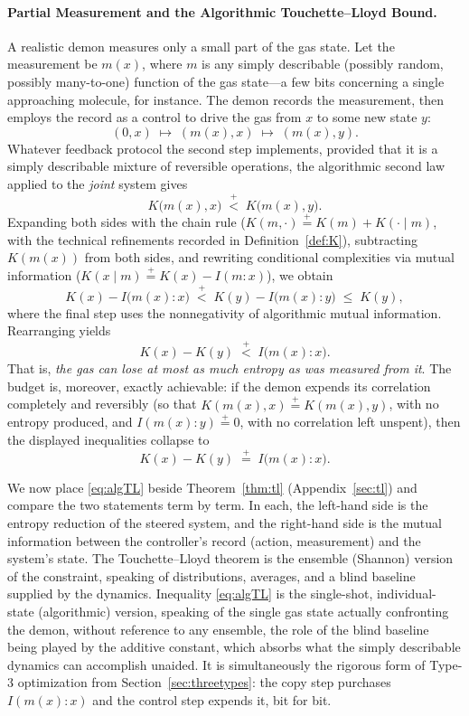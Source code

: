 \documentclass[10pt]{article}
\theoremstyle{definition}
\theoremstyle{remark}
\newcommand{\plt}{\mathrel{\stackrel{+}{<}}}
\newcommand{\peq}{\mathrel{\stackrel{+}{=}}}
\begin{document}
\paragraph{Partial Measurement and the Algorithmic Touchette--Lloyd Bound.} A realistic demon measures only a small part of the gas state. Let the measurement be $m(x)$, where $m$ is any simply describable (possibly random, possibly many-to-one) function of the gas state---a few bits concerning a single approaching molecule, for instance. The demon records the measurement, then employs the record as a control to drive the gas from $x$ to some new state $y$:
\[
(0, x) \;\mapsto\; (m(x), x) \;\mapsto\; (m(x), y).
\]
Whatever feedback protocol the second step implements, provided that it is a simply describable mixture of reversible operations, the algorithmic second law applied to the \emph{joint} system gives
\[
K\big(m(x), x\big) \;\plt\; K\big(m(x), y\big).
\]
Expanding both sides with the chain rule ($K(m,\cdot) \peq K(m) + K(\cdot \mid m)$, with the technical refinements recorded in Definition~\ref{def:K}), subtracting $K(m(x))$ from both sides, and rewriting conditional complexities via mutual information ($K(x \mid m) \peq K(x) - I(m : x)$), we obtain
\[
K(x) - I\big(m(x) : x\big) \;\plt\; K(y) - I\big(m(x) : y\big) \;\le\; K(y),
\]
where the final step uses the nonnegativity of algorithmic mutual information. Rearranging yields
\begin{equation}
\label{eq:algTL}
\boxed{\;K(x) - K(y) \;\plt\; I\big(m(x) : x\big).\;}
\end{equation}
That is, \emph{the gas can lose at most as much entropy as was measured from it}. The budget is, moreover, exactly achievable: if the demon expends its correlation completely and reversibly (so that $K(m(x), x) \peq K(m(x), y)$, with no entropy produced, and $I(m(x) : y) \peq 0$, with no correlation left unspent), then the displayed inequalities collapse to
\[
K(x) - K(y) \;\peq\; I\big(m(x) : x\big).
\]

We now place \eqref{eq:algTL} beside Theorem~\ref{thm:tl} (Appendix~\ref{sec:tl}) and compare the two statements term by term. In each, the left-hand side is the entropy reduction of the steered system, and the right-hand side is the mutual information between the controller's record (action, measurement) and the system's state. The Touchette--Lloyd theorem is the ensemble (Shannon) version of the constraint, speaking of distributions, averages, and a blind baseline supplied by the dynamics. Inequality \eqref{eq:algTL} is the single-shot, individual-state (algorithmic) version, speaking of the single gas state actually confronting the demon, without reference to any ensemble, the role of the blind baseline being played by the additive constant, which absorbs what the simply describable dynamics can accomplish unaided. It is simultaneously the rigorous form of Type-3 optimization from Section~\ref{sec:threetypes}: the copy step purchases $I(m(x):x)$ and the control step expends it, bit for bit.
\end{document}

